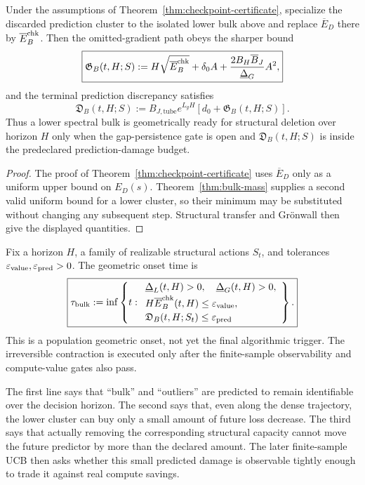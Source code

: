 \begin{corollary}\label{cor:bulk-readiness}
Under the assumptions of Theorem~\ref{thm:checkpoint-certificate}, specialize the discarded prediction cluster to the isolated lower bulk above and replace $\overline E_D$ there by $\overline E_B^{\rm chk}$.  Then the omitted-gradient path obeys the sharper bound
\[
\boxed{
\mathfrak G_B(t,H;S)
:=H\sqrt{\overline E_B^{\rm chk}}
+\delta_0A
+\frac{2B_H\overline B_J}{\underline\Delta_G}A^2,}
\]
and the terminal prediction discrepancy satisfies
\[
\boxed{
\mathfrak D_B(t,H;S)
:=B_{J,\mathrm{tube}}e^{L_gH}
\left[d_0+\mathfrak G_B(t,H;S)\right].}
\]
Thus a lower spectral bulk is geometrically ready for structural deletion over horizon $H$ only when the gap-persistence gate is open and $\mathfrak D_B(t,H;S)$ is inside the predeclared prediction-damage budget.
\end{corollary}

\begin{proof}
The proof of Theorem~\ref{thm:checkpoint-certificate} uses $\overline E_D$ only as a uniform upper bound on $E_D(s)$.  Theorem~\ref{thm:bulk-mass} supplies a second valid uniform bound for a lower cluster, so their minimum may be substituted without changing any subsequent step.  Structural transfer and Gr\"onwall then give the displayed quantities.
\end{proof}

\begin{definition}\label{def:bulk-onset}
Fix a horizon $H$, a family of realizable structural actions $S_t$, and tolerances $\varepsilon_{\rm value},\varepsilon_{\rm pred}>0$.  The geometric onset time is
\[
\boxed{
\tau_{\rm bulk}
:=\inf\left\{t:\begin{array}{l}
\underline\Delta_L(t,H)>0,\quad \underline\Delta_G(t,H)>0,\\[2pt]
H\overline E_B^{\rm chk}(t,H)\le\varepsilon_{\rm value},\\[2pt]
\mathfrak D_B(t,H;S_t)\le\varepsilon_{\rm pred}
\end{array}\right\}.}
\]
This is a population geometric onset, not yet the final algorithmic trigger.  The irreversible contraction is executed only after the finite-sample observability and compute-value gates also pass.
\end{definition}

\begin{remark}
The first line says that ``bulk'' and ``outliers'' are predicted to remain identifiable over the decision horizon.  The second says that, even along the dense trajectory, the lower cluster can buy only a small amount of future loss decrease.  The third says that actually removing the corresponding structural capacity cannot move the future predictor by more than the declared amount.  The later finite-sample UCB then asks whether this small predicted damage is observable tightly enough to trade it against real compute savings.
\end{remark}

